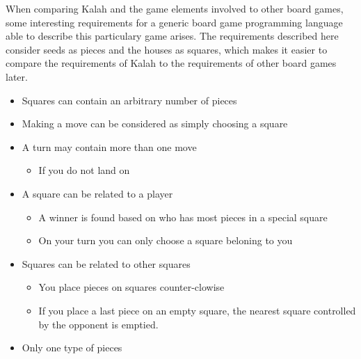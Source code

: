When comparing Kalah and the game elements involved to other board games, some interesting requirements for a generic board game programming language able to describe this particulary game arises. The requirements described here consider seeds as pieces and the houses as squares, which makes it easier to compare the requirements of Kalah to the requirements of other board games later.
\begin{itemize}
\item Squares can contain an arbitrary number of pieces
\item Making a move can be considered as simply choosing a square
\item A turn may contain more than one move
	\begin{itemize}
	\item If you do not land on 
	\end{itemize}
\item A square can be related to a player
	\begin{itemize}
	\item A winner is found based on who has most pieces in a special square
	\item On your turn you can only choose a square beloning to you
	\end{itemize}
\item Squares can be related to other squares
	\begin{itemize}
	\item You place pieces on squares counter-clowise
	\item If you place a last piece on an empty square, the nearest square controlled by the opponent is emptied.
	\end{itemize}
\item Only one type of pieces
\end{itemize}
